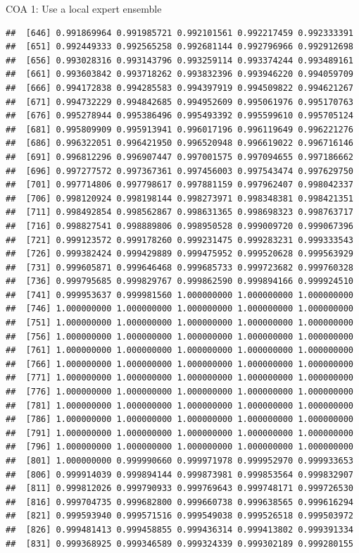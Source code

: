 \documentclass[ignorenonframetext,]{beamer}
\begin{document}
\begin{frame}[fragile]{COA 1: Use a local expert ensemble}
\begin{verbatim}
##  [646] 0.991869964 0.991985721 0.992101561 0.992217459 0.992333391
##  [651] 0.992449333 0.992565258 0.992681144 0.992796966 0.992912698
##  [656] 0.993028316 0.993143796 0.993259114 0.993374244 0.993489161
##  [661] 0.993603842 0.993718262 0.993832396 0.993946220 0.994059709
##  [666] 0.994172838 0.994285583 0.994397919 0.994509822 0.994621267
##  [671] 0.994732229 0.994842685 0.994952609 0.995061976 0.995170763
##  [676] 0.995278944 0.995386496 0.995493392 0.995599610 0.995705124
##  [681] 0.995809909 0.995913941 0.996017196 0.996119649 0.996221276
##  [686] 0.996322051 0.996421950 0.996520948 0.996619022 0.996716146
##  [691] 0.996812296 0.996907447 0.997001575 0.997094655 0.997186662
##  [696] 0.997277572 0.997367361 0.997456003 0.997543474 0.997629750
##  [701] 0.997714806 0.997798617 0.997881159 0.997962407 0.998042337
##  [706] 0.998120924 0.998198144 0.998273971 0.998348381 0.998421351
##  [711] 0.998492854 0.998562867 0.998631365 0.998698323 0.998763717
##  [716] 0.998827541 0.998889806 0.998950528 0.999009720 0.999067396
##  [721] 0.999123572 0.999178260 0.999231475 0.999283231 0.999333543
##  [726] 0.999382424 0.999429889 0.999475952 0.999520628 0.999563929
##  [731] 0.999605871 0.999646468 0.999685733 0.999723682 0.999760328
##  [736] 0.999795685 0.999829767 0.999862590 0.999894166 0.999924510
##  [741] 0.999953637 0.999981560 1.000000000 1.000000000 1.000000000
##  [746] 1.000000000 1.000000000 1.000000000 1.000000000 1.000000000
##  [751] 1.000000000 1.000000000 1.000000000 1.000000000 1.000000000
##  [756] 1.000000000 1.000000000 1.000000000 1.000000000 1.000000000
##  [761] 1.000000000 1.000000000 1.000000000 1.000000000 1.000000000
##  [766] 1.000000000 1.000000000 1.000000000 1.000000000 1.000000000
##  [771] 1.000000000 1.000000000 1.000000000 1.000000000 1.000000000
##  [776] 1.000000000 1.000000000 1.000000000 1.000000000 1.000000000
##  [781] 1.000000000 1.000000000 1.000000000 1.000000000 1.000000000
##  [786] 1.000000000 1.000000000 1.000000000 1.000000000 1.000000000
##  [791] 1.000000000 1.000000000 1.000000000 1.000000000 1.000000000
##  [796] 1.000000000 1.000000000 1.000000000 1.000000000 1.000000000
##  [801] 1.000000000 0.999990660 0.999971978 0.999952970 0.999933653
##  [806] 0.999914039 0.999894144 0.999873981 0.999853564 0.999832907
##  [811] 0.999812026 0.999790933 0.999769643 0.999748171 0.999726530
##  [816] 0.999704735 0.999682800 0.999660738 0.999638565 0.999616294
##  [821] 0.999593940 0.999571516 0.999549038 0.999526518 0.999503972
##  [826] 0.999481413 0.999458855 0.999436314 0.999413802 0.999391334
##  [831] 0.999368925 0.999346589 0.999324339 0.999302189 0.999280155

\end{verbatim}
\end{frame}
\end{document}
